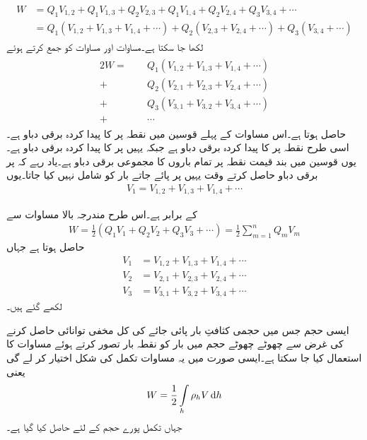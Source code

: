 \begin{gather}
\begin{aligned}\label{مساوات_توانائی_بار_کثافت_توانائی_ب}
W&=Q_1 V_{1,2}+Q_1 V_{1,3} +Q_2 V_{2,3}+Q_1 V_{1,4} +Q_2 V_{2,4}+Q_3 V_{3,4}+\cdots\\
&=Q_1 (V_{1,2}+V_{1,3} + V_{1,4} +\cdots)+Q_2 (V_{2,3}+V_{2,4}+\cdots)+Q_3(V_{3,4}+\cdots)
\end{aligned}
\end{gather}
  لکھا جا سکتا ہے۔مساوات  اور مساوات  کو جمع کرتے ہوئے
\begin{gather}
\begin{aligned}
2 W=\phantom{+}&Q_1(V_{1,2}+V_{1,3} + V_{1,4} +\cdots)\\
+&Q_2 (V_{2,1}+V_{2,3}+V_{2,4}+\cdots)\\
+&Q_3( V_{3,1}+V_{3,2}+V_{3,4}+\cdots)\\
+&\cdots
\end{aligned}
\end{gather}
حاصل ہوتا ہے۔اس مساوات کے پہلے قوسین میں  نقطہ  پر  کا پیدا کردہ برقی دباو ہے۔اسی طرح  نقطہ  پر  کا پیدا کردہ برقی دباو ہے جبکہ  یہیں پر  کا پیدا کردہ برقی دباو ہے۔یوں قوسین میں بند قیمت نقطہ  پر تمام باروں کا مجموعی برقی دباو  ہے۔یاد رہے کہ  پر برقی دباو حاصل کرتے وقت یہیں پر پائے جاتے بار  کو شامل نہیں کیا جاتا۔یوں
\begin{align*}
V_1=V_{1,2}+V_{1,3} + V_{1,4} +\cdots
\end{align*}

کے برابر ہے۔اس طرح مندرجہ بالا مساوات سے
\begin{align}\label{مساوات_توانائی_بار_کثافت_توانائی_پ}
W=\frac{1}{2}\left(Q_1 V_1+Q_2 V_2+Q_3 V_3+\cdots\right)=\frac{1}{2}\sum_{m=1}^{n} Q_m V_m
\end{align}
حاصل ہوتا ہے جہاں 
\begin{align*}
V_1&=V_{1,2}+V_{1,3} + V_{1,4} +\cdots\\
V_2&=V_{2,1}+V_{2,3}+V_{2,4}+\cdots\\
V_3&=V_{3,1}+V_{3,2}+V_{3,4}+\cdots
\end{align*}
لکھے گئے ہیں۔

ایسی حجم جس میں حجمی کثافتِ بار  پائی جائے کی کل مخفی توانائی حاصل کرنے کی غرض سے  چھوٹے چھوٹے حجم  میں بار  کو نقطہ بار تصور کرتے ہوئے مساوات  کا استعمال کیا جا سکتا ہے۔ایسی صورت میں یہ مساوات تکمل کی شکل اختیار کر لے گی یعنی
 \begin{align}\label{مساوات_توانائی_کثافت_تونائی}
W=\frac{1}{2}\int \limits_h \rho_h V \dif h
\end{align}
جہاں تکمل پورے حجم  کے لئے حاصل کیا گیا ہے۔

